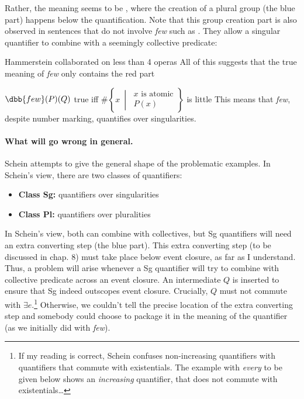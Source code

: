 \documentclass[english]{article}
\begin{document}
Rather, the meaning seems to be , where the creation of a plural group (the blue part) happens below the  quantification. Note that this group creation part is also observed in sentences that do not involve \emph{few} such as \cnextx. They allow a singular quantifier to combine with a seemingly collective predicate:

\ex
Hammerstein collaborated on less than 4 operas
\xe
%
All of this suggests that the true meaning of \emph{few} only contains the red part

\ex
$\dbb{few}(P)(Q)$ true iff {\color{darkred}$\#\left\lbrace x\ \middle|\ 
\begin{array}{l}
x\text{ is atomic}\\
P(x)
\end{array}
\right\rbrace$ is little \label{few2}
}\xe
%
This means that \emph{few}, despite number marking, quantifies over singularities.

\paragraph{What will go wrong in general.} 
Schein attempts to give the general shape of the problematic examples.
In Schein's view, there are two classes of quantifiers:

\begin{itemize}
\item \textbf{Class Sg:} quantifiers over singularities 
\item \textbf{Class Pl:} quantifiers over pluralities
\end{itemize}
%
In Schein's view, both can combine with collectives, but Sg quantifiers will need an extra converting step (the blue part). This extra converting step (to be discussed in chap. 8) must take place below event closure, as far as I understand. Thus, a problem will arise whenever a Sg quantifier will try to combine with collective predicate across an event closure. An intermediate $Q$ is inserted to ensure that Sg indeed outscopes event closure. Crucially, $Q$ must not commute with $\exists e$.\footnote{If my reading is correct, Schein confuses non-increasing quantifiers with quantifiers that commute with existentials. The example with \emph{every} to be given below shows an \emph{increasing} quantifier, that does not commute with existentials\ldots} Otherwise, we couldn't tell the precise location of the extra converting step and somebody could choose to package it in the meaning of the quantifier (as we initially did with \emph{few}).
\end{document}
